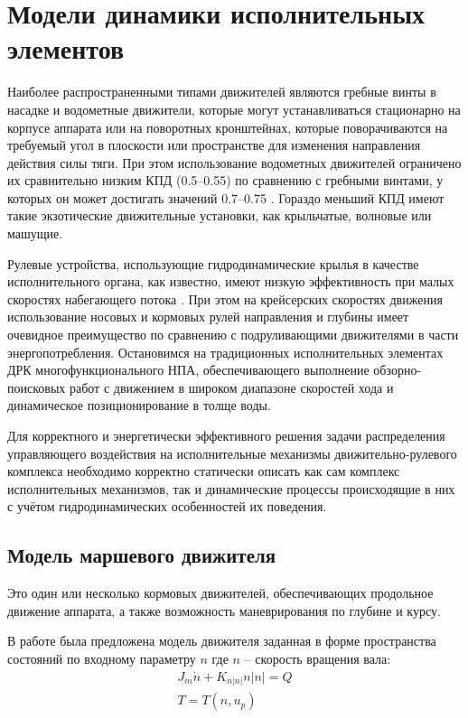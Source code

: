 \section{Модели динамики исполнительных элементов}\label{sec:Propulsion/Model}
Наиболее распространенными типами движителей являются гребные винты в насадке и водометные движители, которые могут устанавливаться стационарно на корпусе аппарата или на поворотных кронштейнах, которые поворачиваются на требуемый угол в плоскости или пространстве для изменения направления действия силы тяги.
При этом использование водометных движителей ограничено их сравнительно низким КПД (0.5–0.55) по сравнению с гребными винтами, у которых он может достигать значений 0.7–0.75 \cite{инзарцев2018подводные}. Гораздо меньший КПД имеют такие экзотические движительные установки, как крыльчатые, волновые или машущие. 

Рулевые устройства, использующие гидродинамические крылья в качестве исполнительного органа, как известно, имеют низкую эффективность при малых скоростях набегающего потока \cite{агеев2015авто}.
При этом на крейсерских скоростях движения использование носовых и кормовых рулей направления и глубины имеет очевидное преимущество по сравнению с подруливающими движителями в части энергопотребления.
Остановимся на традиционных исполнительных элементах ДРК многофункционального НПА, обеспечивающего выполнение обзорно-поисковых работ с движением в широком диапазоне скоростей хода и динамическое позиционирование в толще воды.

Для корректного и энергетически эффективного решения задачи распределения управляющего воздействия на исполнительные механизмы движительно-рулевого комплекса необходимо корректно статически описать как сам комплекс исполнительных механизмов, так и динамические процессы происходящие в них с учётом гидродинамических особенностей их поведения.

\subsection{Модель маршевого движителя}
Это один или несколько кормовых движителей, обеспечивающих продольное движение аппарата, а также возможность маневрирования по глубине и курсу.

В работе \cite{10.1109/48.107145} была предложена модель движителя заданная в форме пространства состояний по входному параметру $n$ где $n$ -- скорость вращения вала:
\begin{gather}
    \label{eq:thruster_dynamic_1}
    J_m\dot{n} + K_{n|n|}n|n| = Q \\
    T = T(n, u_p)
\end{gather}

